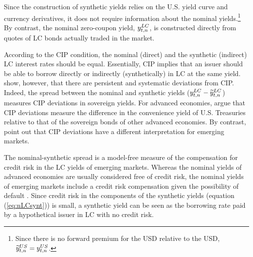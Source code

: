 {Since the construction of synthetic yields %
relies on the U.S. yield curve and currency derivatives, it does not require information about the nominal yields.\footnote{ Since there is no forward premium for the USD relative to the USD, \(\widetilde{y}_{t,n} ^{US} = y_{t,n} ^{US}\).} By contrast, the nominal zero-coupon yield, \(y_{t,n} ^{LC}\), is constructed directly from quotes of 
LC bonds actually traded in the market.

According to the CIP condition, the nominal (direct) and the synthetic (indirect) LC interest rates should be equal. 
Essentially, CIP implies that an %
issuer should be able to borrow directly or indirectly (synthetically) in LC at the same yield. 
\cite{DuTepperVerdelhan:2018} show, however, that there are persistent and systematic deviations from CIP. 
Indeed, the spread between the nominal and synthetic yields (\(y_{t,n} ^{LC} - \widetilde{y}_{t,n} ^{LC}\)) measures CIP deviations in sovereign yields.
For advanced economies, \cite{DuImSchreger:2018JIE} argue that CIP deviations measure the difference in the convenience yield of U.S. Treasuries relative to that of the sovereign bonds of other advanced economies.
By contrast, \cite{DuSchreger:2016JoF} point out that CIP deviations have a different interpretation for emerging markets. 

The nominal-synthetic spread is a model-free measure of the compensation for credit risk %
in the LC yields of emerging markets.
Whereas the nominal yields of advanced economies are usually considered free of credit risk, the nominal yields of emerging markets include a credit risk compensation given the possibility of default \citep{DuSchreger:2016JoF,DuSchreger:2017WP}.
Since credit risk in the components of the synthetic yields (equation (\ref{eq:nLCsynt})) is small, a synthetic yield can be seen as the borrowing rate paid by a hypothetical issuer in LC with no credit risk. 

}
